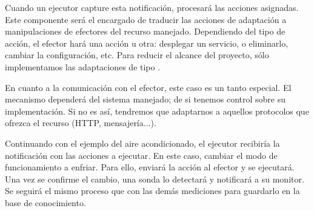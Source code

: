 Cuando un ejecutor capture esta notificación, procesará las acciones asignadas. Este componente será el encargado de traducir las acciones de adaptación a manipulaciones de efectores del recurso manejado. Dependiendo del tipo de acción, el efector hará una acción u otra: desplegar un servicio, o eliminarlo, cambiar la configuración, etc. Para reducir el alcance del proyecto, sólo implementamos las adaptaciones de tipo .

En cuanto a la comunicación con el efector, este caso es un tanto especial. El mecanismo dependerá del sistema manejado; de si tenemos control sobre su implementación. Si no es así, tendremos que adaptarnos a aquellos protocolos que ofrezca el recurso (HTTP, mensajería...).

Continuando con el ejemplo del aire acondicionado, el ejecutor recibiría la notificación con las acciones a ejecutar. En este caso, cambiar el modo de funcionamiento a enfriar. Para ello, enviará la acción al efector y se ejecutará. Una vez se confirme el cambio, una sonda lo detectará y notificará a su monitor. Se seguirá el mismo proceso que con las demás mediciones para guardarlo en la base de conocimiento.

